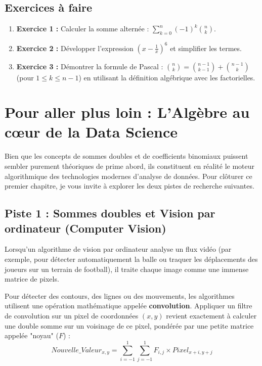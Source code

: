 \subsection{Exercices à faire}
\begin{enumerate}
    \item \textbf{Exercice 1 :} Calculer la somme alternée : $\sum_{k=0}^n (-1)^k \binom{n}{k}$.
    \item \textbf{Exercice 2 :} Développer l'expression $\left( x - \frac{1}{x} \right)^6$ et simplifier les termes.
    \item \textbf{Exercice 3 :} Démontrer la formule de Pascal : $\binom{n}{k} = \binom{n-1}{k-1} + \binom{n-1}{k}$ (pour $1 \le k \le n-1$) en utilisant la définition algébrique avec les factorielles.
\end{enumerate}

\section*{Pour aller plus loin : L'Algèbre au cœur de la Data Science}

Bien que les concepts de sommes doubles et de coefficients binomiaux puissent sembler purement théoriques de prime abord, ils constituent en réalité le moteur algorithmique des technologies modernes d'analyse de données. Pour clôturer ce premier chapitre, je vous invite à explorer les deux pistes de recherche suivantes.

\subsection*{Piste 1 : Sommes doubles et Vision par ordinateur (Computer Vision)}
Lorsqu'un algorithme de vision par ordinateur analyse un flux vidéo (par exemple, pour détecter automatiquement la balle ou traquer les déplacements des joueurs sur un terrain de football), il traite chaque image comme une immense matrice de pixels. 

Pour détecter des contours, des lignes ou des mouvements, les algorithmes utilisent une opération mathématique appelée \textbf{convolution}. Appliquer un filtre de convolution sur un pixel de coordonnées $(x,y)$ revient exactement à calculer une double somme sur un voisinage de ce pixel, pondérée par une petite matrice appelée "noyau" ($F$) :
$$ Nouvelle\_Valeur_{x,y} = \sum_{i=-1}^{1} \sum_{j=-1}^{1} F_{i,j} \times Pixel_{x+i, y+j} $$



